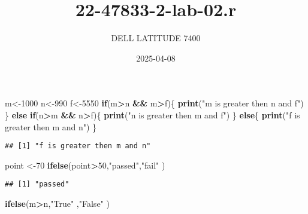 \documentclass[
]{article}
\title{22-47833-2-lab-02.r}
\author{DELL LATITUDE 7400}
\date{2025-04-08}
\newenvironment{Shaded}{\begin{snugshade}}{\end{snugshade}}
\newcommand{\ControlFlowTok}[1]{\textcolor[rgb]{0.13,0.29,0.53}{\textbf{#1}}}
\newcommand{\DecValTok}[1]{\textcolor[rgb]{0.00,0.00,0.81}{#1}}
\newcommand{\FunctionTok}[1]{\textcolor[rgb]{0.13,0.29,0.53}{\textbf{#1}}}
\newcommand{\NormalTok}[1]{#1}
\newcommand{\OtherTok}[1]{\textcolor[rgb]{0.56,0.35,0.01}{#1}}
\newcommand{\SpecialCharTok}[1]{\textcolor[rgb]{0.81,0.36,0.00}{\textbf{#1}}}
\newcommand{\StringTok}[1]{\textcolor[rgb]{0.31,0.60,0.02}{#1}}
\begin{document}
\maketitle

\begin{Shaded}
\begin{Highlighting}[]
\NormalTok{m}\OtherTok{\textless{}{-}}\DecValTok{1000}
\NormalTok{n}\OtherTok{\textless{}{-}}\DecValTok{990}
\NormalTok{f}\OtherTok{\textless{}{-}}\DecValTok{5550}
\ControlFlowTok{if}\NormalTok{(m}\SpecialCharTok{\textgreater{}}\NormalTok{n }\SpecialCharTok{\&\&}\NormalTok{ m}\SpecialCharTok{\textgreater{}}\NormalTok{f)\{}
    \FunctionTok{print}\NormalTok{(}\StringTok{"m is greater then n and f"}\NormalTok{)}
\NormalTok{\} }\ControlFlowTok{else} \ControlFlowTok{if}\NormalTok{(n}\SpecialCharTok{\textgreater{}}\NormalTok{m }\SpecialCharTok{\&\&}\NormalTok{ n}\SpecialCharTok{\textgreater{}}\NormalTok{f)\{}
    \FunctionTok{print}\NormalTok{(}\StringTok{"n is greater then m and f"}\NormalTok{)}
\NormalTok{\} }\ControlFlowTok{else}\NormalTok{\{}
    \FunctionTok{print}\NormalTok{(}\StringTok{"f is greater then m and n"}\NormalTok{)}
\NormalTok{\}}
\end{Highlighting}
\end{Shaded}

\begin{verbatim}
## [1] "f is greater then m and n"
\end{verbatim}

\begin{Shaded}
\begin{Highlighting}[]
\NormalTok{point }\OtherTok{\textless{}{-}}\DecValTok{70}
\FunctionTok{ifelse}\NormalTok{(point}\SpecialCharTok{\textgreater{}}\DecValTok{50}\NormalTok{,}\StringTok{"passed"}\NormalTok{,}\StringTok{"fail"}\NormalTok{ )}
\end{Highlighting}
\end{Shaded}

\begin{verbatim}
## [1] "passed"
\end{verbatim}

\begin{Shaded}
\begin{Highlighting}[]
\FunctionTok{ifelse}\NormalTok{(m}\SpecialCharTok{\textgreater{}}\NormalTok{n,}\StringTok{"True"}\NormalTok{ ,}\StringTok{"False"}\NormalTok{ )}
\end{Highlighting}
\end{Shaded}
\end{document}

